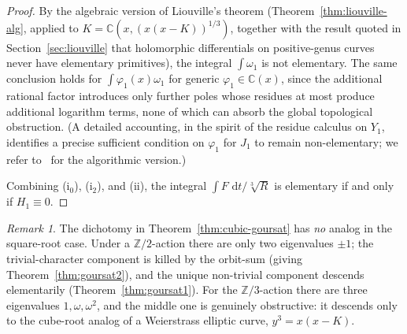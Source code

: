 \documentclass[11pt,a4paper]{article}
\theoremstyle{plain}
\theoremstyle{definition}
\theoremstyle{remark}
\newtheorem{remark}[theorem]{Remark}
\newcommand{\C}{\mathbb{C}}
\newcommand{\Z}{\mathbb{Z}}
\renewcommand{\d}{\,\mathrm{d}}
\begin{document}
\begin{proof}
By the algebraic version of Liouville's theorem (Theorem~\ref{thm:liouville-alg}, applied to $K=\C(x,(x(x-K))^{1/3})$, together with the result quoted in Section~\ref{sec:liouville} that holomorphic differentials on positive-genus curves never have elementary primitives), the integral $\int \omega_1$ is not elementary. The same conclusion holds for $\int \varphi_1(x)\omega_1$ for generic $\varphi_1\in\C(x)$, since the additional rational factor introduces only further poles whose residues at most produce additional logarithm terms, none of which can absorb the global topological obstruction. (A detailed accounting, in the spirit of the residue calculus on $Y_1$, identifies a precise sufficient condition on $\varphi_1$ for $J_1$ to remain non-elementary; we refer to~\cite{Trager1984,Bronstein2005} for the algorithmic version.)

Combining (i$_0$), (i$_2$), and (ii), the integral $\int F\,\d t/\sqrt[3]{R}$ is elementary if and only if $H_1\equiv 0$.
\end{proof}

\begin{remark}
The dichotomy in Theorem~\ref{thm:cubic-goursat} has \emph{no} analog in the square-root case. Under a $\Z/2$-action there are only two eigenvalues $\pm 1$; the trivial-character component is killed by the orbit-sum (giving Theorem~\ref{thm:goursat2}), and the unique non-trivial component descends elementarily (Theorem~\ref{thm:goursat1}). For the $\Z/3$-action there are three eigenvalues $1,\omega,\omega^2$, and the middle one is genuinely obstructive: it descends only to the cube-root analog of a Weierstrass elliptic curve, $y^3 = x(x-K)$.
\end{remark}
\end{document}
